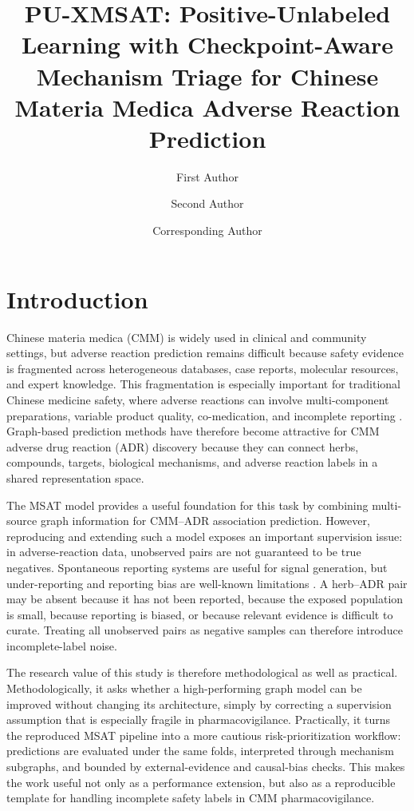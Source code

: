\documentclass[manuscript,screen,review]{acmart}
\title[PU-XMSAT for CMM Adverse Reaction Prediction]{PU-XMSAT: Positive-Unlabeled Learning with Checkpoint-Aware Mechanism Triage for Chinese Materia Medica Adverse Reaction Prediction}
\author{First Author}
\affiliation{%
  \institution{Institution Placeholder}
  \city{City}
  \country{Country}
}
\author{Second Author}
\affiliation{%
  \institution{Institution Placeholder}
  \city{City}
  \country{Country}
}
\author{Corresponding Author}
\affiliation{%
  \institution{Institution Placeholder}
  \city{City}
  \country{Country}
}
\newcommand{\msat}{MSAT}
\begin{document}
\maketitle

\section{Introduction}

Chinese materia medica (CMM) is widely used in clinical and community settings, but adverse reaction prediction remains difficult because safety evidence is fragmented across heterogeneous databases, case reports, molecular resources, and expert knowledge. This fragmentation is especially important for traditional Chinese medicine safety, where adverse reactions can involve multi-component preparations, variable product quality, co-medication, and incomplete reporting \cite{chan2015overview,wu2010recommendations}. Graph-based prediction methods have therefore become attractive for CMM adverse drug reaction (ADR) discovery because they can connect herbs, compounds, targets, biological mechanisms, and adverse reaction labels in a shared representation space.

The \msat{} model provides a useful foundation for this task by combining multi-source graph information for CMM--ADR association prediction. However, reproducing and extending such a model exposes an important supervision issue: in adverse-reaction data, unobserved pairs are not guaranteed to be true negatives. Spontaneous reporting systems are useful for signal generation, but under-reporting and reporting bias are well-known limitations \cite{hazell2006underreporting,bate2009quantitative}. A herb--ADR pair may be absent because it has not been reported, because the exposed population is small, because reporting is biased, or because relevant evidence is difficult to curate. Treating all unobserved pairs as negative samples can therefore introduce incomplete-label noise.

The research value of this study is therefore methodological as well as practical. Methodologically, it asks whether a high-performing graph model can be improved without changing its architecture, simply by correcting a supervision assumption that is especially fragile in pharmacovigilance. Practically, it turns the reproduced \msat{} pipeline into a more cautious risk-prioritization workflow: predictions are evaluated under the same folds, interpreted through mechanism subgraphs, and bounded by external-evidence and causal-bias checks. This makes the work useful not only as a performance extension, but also as a reproducible template for handling incomplete safety labels in CMM pharmacovigilance.
\end{document}
